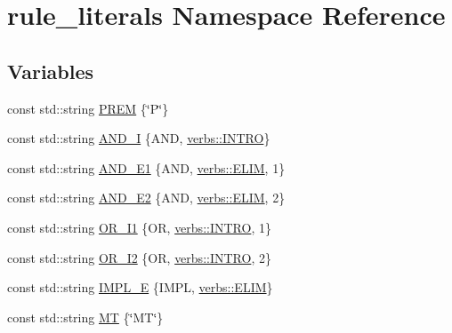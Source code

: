 \hypertarget{namespacerule__literals}{}\section{rule\+\_\+literals Namespace Reference}
\label{namespacerule__literals}
\subsection*{Variables}
\begin{DoxyCompactItemize}
\item 
const std\+::string \hyperlink{namespacerule__literals_a28f9829b438b28638be8c82c450237e1}{P\+R\+EM} \{\char`\"{}P\char`\"{}\}
\item 
const std\+::string \hyperlink{namespacerule__literals_a94631d6e4135b29c6bacb5cde1d9719b}{A\+N\+D\+\_\+I} \{A\+ND, \hyperlink{namespaceverbs_a160cd2b49b96eb11b6db907bf94b5c3a}{verbs\+::\+I\+N\+T\+RO}\}
\item 
const std\+::string \hyperlink{namespacerule__literals_af7751bceefaea1ff69733140731b7770}{A\+N\+D\+\_\+\+E1} \{A\+ND, \hyperlink{namespaceverbs_ae28355cc9321ebee9abcd23bb6e1b836}{verbs\+::\+E\+L\+IM}, \textquotesingle{}1\textquotesingle{}\}
\item 
const std\+::string \hyperlink{namespacerule__literals_a0861b2e3104a4c1465d3dbbb362b5d10}{A\+N\+D\+\_\+\+E2} \{A\+ND, \hyperlink{namespaceverbs_ae28355cc9321ebee9abcd23bb6e1b836}{verbs\+::\+E\+L\+IM}, \textquotesingle{}2\textquotesingle{}\}
\item 
const std\+::string \hyperlink{namespacerule__literals_a0c61940a6e12e4ea3a41346b5b3c5870}{O\+R\+\_\+\+I1} \{OR, \hyperlink{namespaceverbs_a160cd2b49b96eb11b6db907bf94b5c3a}{verbs\+::\+I\+N\+T\+RO}, \textquotesingle{}1\textquotesingle{}\}
\item 
const std\+::string \hyperlink{namespacerule__literals_a2c1ef10ddec67801c44ea5b3e15ed133}{O\+R\+\_\+\+I2} \{OR, \hyperlink{namespaceverbs_a160cd2b49b96eb11b6db907bf94b5c3a}{verbs\+::\+I\+N\+T\+RO}, \textquotesingle{}2\textquotesingle{}\}
\item 
const std\+::string \hyperlink{namespacerule__literals_a51a002ead2192c49b9c6216c5fbe3b74}{I\+M\+P\+L\+\_\+E} \{I\+M\+PL, \hyperlink{namespaceverbs_ae28355cc9321ebee9abcd23bb6e1b836}{verbs\+::\+E\+L\+IM}\}
\item 
const std\+::string \hyperlink{namespacerule__literals_a056c3d0c0b701c07f444b7c5adfa8ff4}{MT} \{\char`\"{}MT\char`\"{}\}
\end{DoxyCompactItemize}


